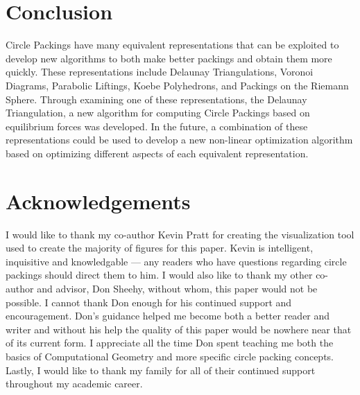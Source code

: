 \documentclass[11pt]{article}
\theoremstyle{definition}
\begin{document}
\section{Conclusion}

	Circle Packings have many equivalent representations that can be exploited to develop new algorithms to both make better packings and obtain them more quickly. 
	These representations include Delaunay Triangulations, Voronoi Diagrams, Parabolic Liftings, Koebe Polyhedrons, and Packings on the Riemann Sphere. 
	Through examining one of these representations, the Delaunay Triangulation, a new algorithm for computing Circle Packings based on equilibrium forces was developed. 
	In the future, a combination of these representations could be used to develop a new non-linear optimization algorithm based on optimizing different aspects of each equivalent representation.

\section{Acknowledgements}
	I would like to thank my co-author Kevin Pratt for creating the visualization tool used to create the majority of figures for this paper. 
	Kevin is intelligent, inquisitive and knowledgable --- any readers who have questions regarding circle packings should direct them to him.
	I would also like to thank my other co-author and advisor, Don Sheehy, without whom, this paper would not be possible.
	I cannot thank Don enough for his continued support and encouragement.
	Don's guidance helped me become both a better reader and writer and without his help the quality of this paper would be nowhere near that of its current form. 
	I appreciate all the time Don spent teaching me both the basics of Computational Geometry and more specific circle packing concepts. 	
	Lastly, I would like to thank my family for all of their continued support throughout my academic career.









\end{document}
